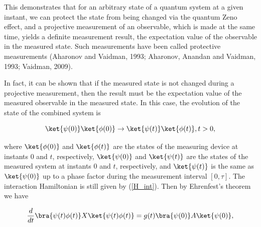 This demonstrates that for an arbitrary state of a quantum system at a given instant, we can protect the state from being changed via the quantum Zeno effect,
and a projective measurement of an observable, which is made at the same time, yields a definite measurement result, the expectation value of the observable in the measured state. 
Such measurements have been called protective measurements (Aharonov and Vaidman, 1993; Aharonov, Anandan and Vaidman, 1993; Vaidman, 2009).

In fact, it can be shown that if the measured state is not changed during a projective measurement, then the result must be the expectation value of the measured observable in the measured state. In this case, the evolution of the state of the combined system is

\begin{equation}
\ket{\psi(0)}\ket{\phi(0)} \rightarrow \ket{\psi(t)}\ket{\phi(t)}, t>0,
\end{equation}

\noindent where $\ket{\phi(0)}$ and $\ket{\phi(t)}$ are the states of the measuring device at instants 0 and $t$, respectively, $\ket{\psi(0)}$ and $\ket{\psi(t)}$ are the states of the measured system at instants 0 and $t$, respectively, and $\ket{\psi(t)}$ is the same as $\ket{\psi(0)}$ up to a phase factor during the measurement interval $[0,\tau]$. The interaction Hamiltonian is still given by (\ref{H_int}). Then by Ehrenfest's theorem we have

\begin{equation}
{d \over dt}\bra{\psi(t)\phi(t)}X\ket{\psi(t)\phi(t)} = g(t)\bra{\psi(0)}A\ket{\psi(0)},
\end{equation}

